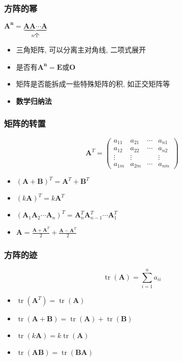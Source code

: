 \documentclass{article}
\begin{document}
				\subsubsection*{方阵的幂}
					$\boldsymbol{A^{n}}=\underbrace{\boldsymbol{A}\boldsymbol{A} \cdots \boldsymbol{A}}_{n\text{个}}$
					\begin{itemize}
						\item 三角矩阵, 可以分离主对角线, 二项式展开
						\item 是否有$\boldsymbol{A^{n}}=\boldsymbol{E}$或$\boldsymbol{O}$
						\item 矩阵是否能拆成一些特殊矩阵的积, 如正交矩阵等
						\item \textbf{数学归纳法}
					\end{itemize}
			\subsubsection{矩阵的转置}
				$$
				\boldsymbol{A}^T=
				\left(\begin{array}{cccc}
					a_{11} & a_{21} & \cdots & a_{n 1} \\
					a_{12} & a_{22} & \cdots & a_{n 2} \\
					\vdots & \vdots & & \vdots \\
					a_{1 m} & a_{2 m} & \cdots & a_{n m}
				\end{array}\right)
				$$
				\begin{itemize}
					\item $(\boldsymbol A+\boldsymbol B)^T=\boldsymbol A^T+\boldsymbol B^T$
					\item $(k\boldsymbol A)^T=k\boldsymbol A^T$
					\item $(\boldsymbol A_{1}\boldsymbol A_{2}\cdots \boldsymbol A_{n})^T=\boldsymbol A_{n}^{T}\boldsymbol A_{n-1}^{T}\cdots \boldsymbol A_{1}^{T}$
					\item $\boldsymbol A=\frac{\boldsymbol A+\boldsymbol A^T}{2}+\frac{\boldsymbol A-\boldsymbol A^T}{2}$
				\end{itemize}
			\subsubsection{方阵的迹}
				$$
				\operatorname{tr}(\boldsymbol{A})=\sum_{i=1}^{n} a_{i i}
				$$
				\begin{itemize}
					\item $\operatorname{tr}\left(\boldsymbol{A}^{T}\right)=\operatorname{tr}(\boldsymbol{A})$
					\item $\operatorname{tr}(\boldsymbol{A}+\boldsymbol{B})=\operatorname{tr}(\boldsymbol{A})+\operatorname{tr}(\boldsymbol{B})$
					\item $\operatorname{tr}(k \boldsymbol{A})=k \operatorname{tr}(\boldsymbol{A})$
					\item $\operatorname{tr}(\boldsymbol{A B})=\operatorname{tr}(\boldsymbol{B} \boldsymbol{A})$
				\end{itemize}
\end{document}
